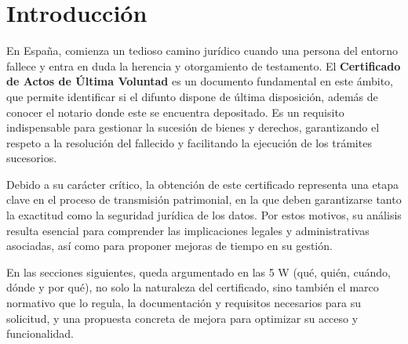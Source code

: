 \part{Introducción}
En España, comienza un tedioso camino jurídico cuando una persona del entorno fallece y entra en duda la herencia y otorgamiento de testamento. El \textbf{Certificado de Actos de Última Voluntad} es un documento fundamental en este ámbito, que permite identificar si el difunto dispone de última disposición, además de conocer el notario donde este se encuentra depositado. Es un requisito indispensable para gestionar la sucesión de bienes y derechos, garantizando el respeto a la resolución del fallecido y facilitando la ejecución de los trámites sucesorios.

Debido a su carácter crítico, la obtención de este certificado representa una etapa clave en el proceso de transmisión patrimonial, en la que deben garantizarse tanto la exactitud como la seguridad jurídica de los datos. Por estos motivos, su análisis resulta esencial para comprender las implicaciones legales y administrativas asociadas, así como para proponer mejoras de tiempo en su gestión.

En las secciones siguientes, queda argumentado en las 5 W (qué, quién, cuándo, dónde y por qué), no solo la naturaleza del certificado, sino también el marco normativo que lo regula, la documentación y requisitos necesarios para su solicitud, y una propuesta concreta de mejora para optimizar su acceso y funcionalidad.
